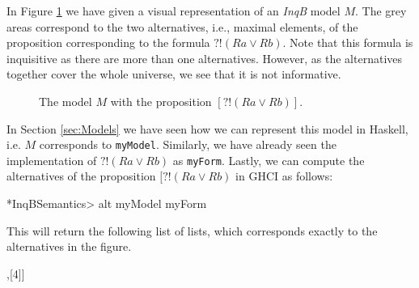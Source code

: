In Figure \ref{fig:Example Model} we have given a visual representation of an \textit{InqB} model $M$. The grey areas correspond to the two alternatives, i.e., maximal elements, of the proposition corresponding to the formula $?!(Ra \lor Rb)$. Note that this formula is inquisitive as there are more than one alternatives. However, as the alternatives together cover the whole universe, we see that it is not informative.

\begin{figure}[ht]
    \centering
    \caption{The model $M$ with the proposition $[?!(Ra \lor Rb)]$.}
    \label{fig:Example Model}
\end{figure}

\noindent In Section \ref{sec:Models} we have seen how we can represent this model in Haskell, i.e. $M$ corresponds to \verb|myModel|. Similarly, we have already seen the implementation of $?!(Ra \lor Rb)$ as \verb|myForm|. Lastly, we can compute the alternatives of the proposition $[?!(Ra \lor Rb)$ in GHCI as follows:
\begin{showCode}
*InqBSemantics> alt myModel myForm
\end{showCode}
\noindent This will return the following list of lists, which corresponds exactly to the alternatives in the figure.
\begin{showCode}
[[1,2,3],[4]]
\end{showCode}